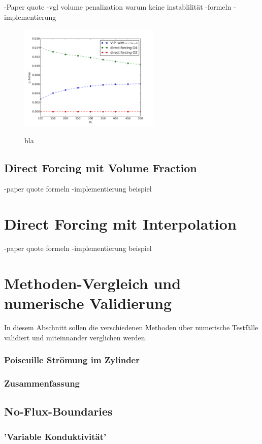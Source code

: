 -Paper quote
-vgl volume penalization warum keine instablilität
-formeln
-implementierung

\begin{figure}[!bp]
  \centering
  \includegraphics[width=0.6\textwidth]{gfx/immersed_boundary_methods/dfo2o4.png}\label{fig:df_o2o4}
  \caption{bla}
\end{figure}

\subsection{Direct Forcing mit Volume Fraction}
-paper quote formeln
-implementierung beispiel

\section{Direct Forcing mit Interpolation}
-paper quote formeln
-implementierung beispiel

\section{Methoden-Vergleich und numerische Validierung}
In diesem Abschnitt sollen die verschiedenen Methoden über numerische Testfälle validiert und miteinnander
verglichen werden.


\subsubsection{Poiseuille Strömung im Zylinder}

\subsubsection{Zusammenfassung}


\subsection{No-Flux-Boundaries}

\subsubsection{'Variable Konduktivität'}










